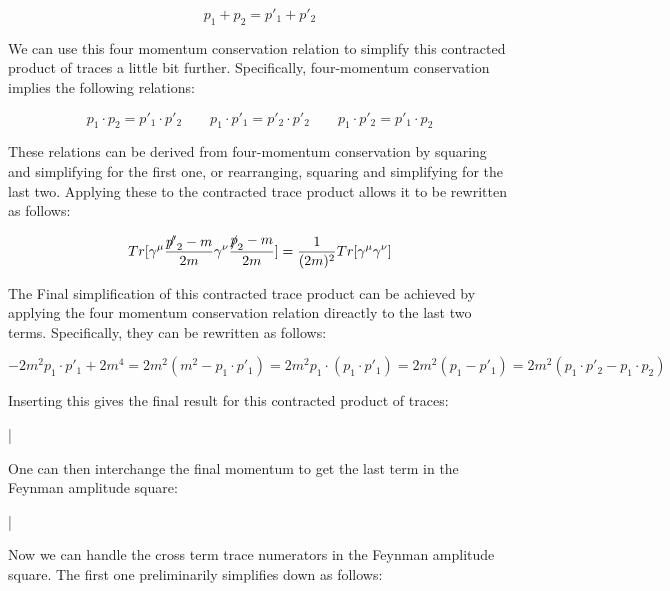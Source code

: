\documentclass[a4]{article}
\begin{document}
    \begin{equation}
        p_1 + p_2 = p'_1 + p'_2
    \end{equation}

    We can use this four momentum conservation relation to simplify this contracted product of traces a little bit further. Specifically, four-momentum conservation implies the following relations:

    \begin{equation}
        p_1 \cdot p_2 = p'_1 \cdot p'_2 \qquad p_1 \cdot p'_1 = p'_2 \cdot p'_2 \qquad p_1 \cdot p'_2 = p'_1 \cdot p_2
    \end{equation}

    These relations can be derived from four-momentum conservation by squaring and simplifying for the first one, or rearranging, squaring and simplifying for the last two. Applying these to the contracted trace product allows it to be rewritten as follows:

    \begin{equation}
        Tr [\gamma^\mu \frac{\slashed{p'}_2 - m}{2m} \gamma^\nu \frac{\slashed{p}_2 - m}{2 m}] = \frac{1}{(2m)^2} Tr[\gamma^\mu \gamma^\nu]
    \end{equation}

    The Final simplification of this contracted trace product can be achieved by applying the four momentum conservation relation direactly to the last two terms. Specifically, they can be rewritten as follows:

    \begin{equation}
        -2 m^2 p_1 \cdot p'_1 + 2 m^4 = 2 m^2 (m^2 - p_1 \cdot p'_1) = 2 m^2 p_1 \cdot (p_1 \cdot p'_1) = 2 m^2 (p_1 - p'_1) = 2 m^2 (p_1 \cdot p'_2 - p_1 \cdot p_2)
    \end{equation}

    Inserting this gives the final result for this contracted product of traces:

    \begin{framed}
        |
    \end{framed}

    One can then interchange the final momentum to get the last term in the Feynman amplitude square:

    \begin{framed}
        |
    \end{framed}

    Now we can handle the cross term trace numerators in the Feynman amplitude square. The first one preliminarily simplifies down as follows:
\end{document}
